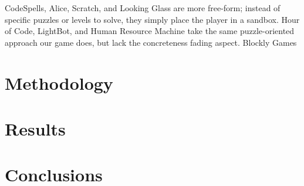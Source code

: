 \documentclass[12pt,notitlepage]{article}
\begin{document}
CodeSpells, Alice, Scratch, and Looking Glass are more free-form;
instead of specific puzzles or levels to solve, they simply place the
player in a sandbox. Hour of Code, LightBot, and Human Resource
Machine take the same puzzle-oriented approach our game does, but lack
the concreteness fading aspect. Blockly Games

\section{Methodology}

\section{Results}

\section{Conclusions}
\end{document}
